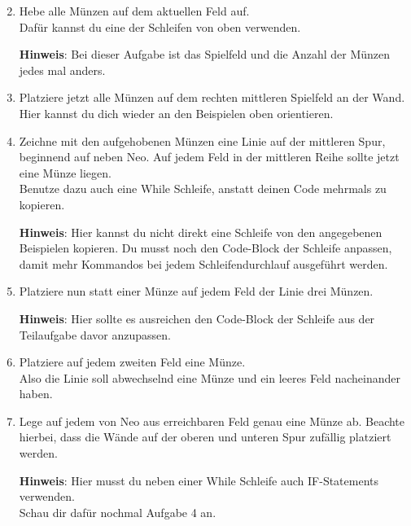 \begin{enumerate} \setcounter{enumi}{1}
        \item Hebe alle Münzen auf dem aktuellen Feld auf.\\
        Dafür kannst du eine der Schleifen von oben verwenden.

    \textbf{Hinweis}: Bei dieser Aufgabe ist das Spielfeld und die Anzahl der Münzen jedes mal anders.
    \item Platziere jetzt alle Münzen auf dem rechten mittleren Spielfeld an der Wand. 
        Hier kannst du dich wieder an den Beispielen oben orientieren.
    \item Zeichne mit den aufgehobenen Münzen eine Linie auf der mittleren Spur, beginnend auf  neben Neo.
        Auf jedem Feld in der mittleren Reihe sollte jetzt eine Münze liegen.\\
        Benutze dazu auch eine While Schleife, anstatt deinen Code mehrmals zu kopieren.

    \textbf{Hinweis}: Hier kannst du nicht direkt eine Schleife von den angegebenen Beispielen kopieren.
        Du musst noch den Code-Block der Schleife anpassen, damit mehr Kommandos bei jedem Schleifendurchlauf ausgeführt werden.
    \item Platziere nun statt einer Münze auf jedem Feld der Linie drei Münzen.

    \textbf{Hinweis}: Hier sollte es ausreichen den Code-Block der Schleife aus der Teilaufgabe davor anzupassen.
    \item Platziere auf jedem zweiten Feld eine Münze.\\
        Also die Linie soll abwechselnd eine Münze und ein leeres Feld nacheinander haben.
    \item \optional Lege auf jedem von Neo aus erreichbaren Feld genau eine Münze ab. 
        Beachte hierbei, dass die Wände auf der oberen und unteren Spur zufällig platziert werden.

    \textbf{Hinweis}: Hier musst du neben einer While Schleife auch IF-Statements verwenden.\\
        Schau dir dafür nochmal Aufgabe 4 an.
\end{enumerate}
